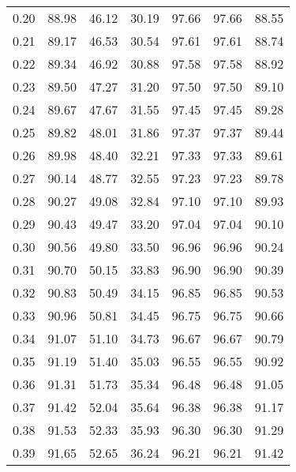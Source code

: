 \begin{tabular}{|c|c|c|c|c|c|c|}
      0.20 &     88.98 &     46.12 &      30.19 &   97.66 &      97.66 &         88.55 \\
      0.21 &     89.17 &     46.53 &      30.54 &   97.61 &      97.61 &         88.74 \\
      0.22 &     89.34 &     46.92 &      30.88 &   97.58 &      97.58 &         88.92 \\
      0.23 &     89.50 &     47.27 &      31.20 &   97.50 &      97.50 &         89.10 \\
      0.24 &     89.67 &     47.67 &      31.55 &   97.45 &      97.45 &         89.28 \\
      0.25 &     89.82 &     48.01 &      31.86 &   97.37 &      97.37 &         89.44 \\
      0.26 &     89.98 &     48.40 &      32.21 &   97.33 &      97.33 &         89.61 \\
      0.27 &     90.14 &     48.77 &      32.55 &   97.23 &      97.23 &         89.78 \\
      0.28 &     90.27 &     49.08 &      32.84 &   97.10 &      97.10 &         89.93 \\
      0.29 &     90.43 &     49.47 &      33.20 &   97.04 &      97.04 &         90.10 \\
      0.30 &     90.56 &     49.80 &      33.50 &   96.96 &      96.96 &         90.24 \\
      0.31 &     90.70 &     50.15 &      33.83 &   96.90 &      96.90 &         90.39 \\
      0.32 &     90.83 &     50.49 &      34.15 &   96.85 &      96.85 &         90.53 \\
      0.33 &     90.96 &     50.81 &      34.45 &   96.75 &      96.75 &         90.66 \\
      0.34 &     91.07 &     51.10 &      34.73 &   96.67 &      96.67 &         90.79 \\
      0.35 &     91.19 &     51.40 &      35.03 &   96.55 &      96.55 &         90.92 \\
      0.36 &     91.31 &     51.73 &      35.34 &   96.48 &      96.48 &         91.05 \\
      0.37 &     91.42 &     52.04 &      35.64 &   96.38 &      96.38 &         91.17 \\
      0.38 &     91.53 &     52.33 &      35.93 &   96.30 &      96.30 &         91.29 \\
      0.39 &     91.65 &     52.65 &      36.24 &   96.21 &      96.21 &         91.42 \\

\end{tabular}
